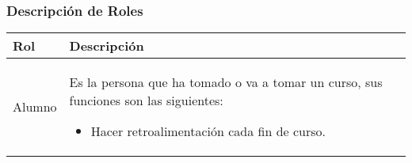 \newpage
\subsubsection{Descripción de Roles}


\begin{longtable}{|p{5cm}|p{11cm}|}%
		\hline
			\textbf{Rol} & \textbf{Descripción}\\ %
		\hline\hline %
			{Alumno} & {Es la persona que ha tomado o va a tomar un curso, sus funciones son las siguientes:
		\begin{itemize}
			\item Hacer retroalimentaci\'on cada fin de curso.
		\end{itemize}

}
\end{longtable}
